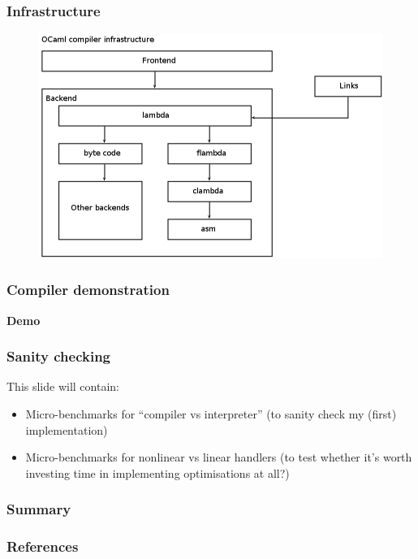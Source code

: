 \documentclass[10pt,compress]{beamer}
\begin{document}
\begin{frame}
  \frametitle{Infrastructure}
\begin{figure}
  \includegraphics[scale=0.4]{infrastructure.png}
\end{figure}
\end{frame}

\begin{frame}
  \frametitle{Compiler demonstration}
  \begin{center}
    {\Huge\textbf{Demo}}
  \end{center}
\end{frame}

\begin{frame}
  \frametitle{Sanity checking}
  This slide will contain:
  \begin{itemize}
    \item Micro-benchmarks for ``compiler vs interpreter'' (to sanity check my (first) implementation)
    \item Micro-benchmarks for nonlinear vs linear handlers (to test whether it's worth investing time in implementing optimisations at all?)
  \end{itemize}
\end{frame}

\begin{frame}
  \frametitle{Summary}
\end{frame}

\begin{frame}
  \frametitle{References}
  \nocite{*}
  
  
\end{frame}
\end{document}
